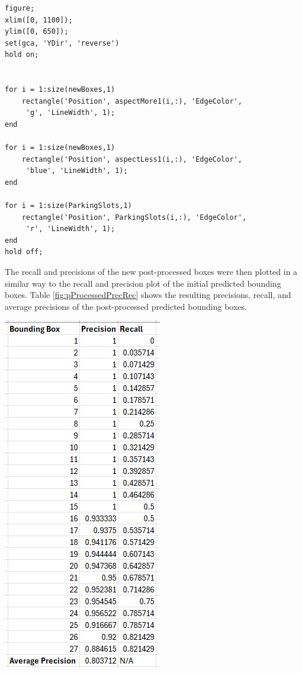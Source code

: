 \documentclass[man]{apa7}
\begin{document}
\begin{lstlisting}
figure;
xlim([0, 1100]);
ylim([0, 650]);
set(gca, 'YDir', 'reverse')
hold on;


for i = 1:size(newBoxes,1)
    rectangle('Position', aspectMore1(i,:), 'EdgeColor',
     'g', 'LineWidth', 1);
end

for i = 1:size(newBoxes,1)
    rectangle('Position', aspectLess1(i,:), 'EdgeColor',
     'blue', 'LineWidth', 1);
end

for i = 1:size(ParkingSlots,1)
    rectangle('Position', ParkingSlots(i,:), 'EdgeColor',
     'r', 'LineWidth', 1);
end
hold off;
\end{lstlisting}

The recall and precisions of the new post-processed boxes were then plotted in a similar way to the recall and precision plot of the initial predicted bounding boxes. Table \ref{fig:pProcessedPrecRec} shows the resulting precisions, recall, and average precisions of the post-processed predicted bounding boxes.

\newpage

\begin{minipage}{\linewidth}
  \includegraphics[]{figures/finalPrecRec.png}
  \label{fig:pProcessedPrecRec}
\end{minipage}
\end{document}

